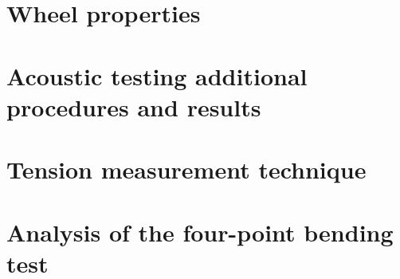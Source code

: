 \documentclass{nuthesis}
\begin{document}
\chapter{Wheel properties}
\label{app:wheel_properties}


\chapter{Acoustic testing additional procedures and results}
\label{app:acoustic_testing}


\chapter{Tension measurement technique}
\label{app:tension_measurement}


\chapter{Analysis of the four-point bending test}
\label{app:four_pt_bend}

\end{document}
